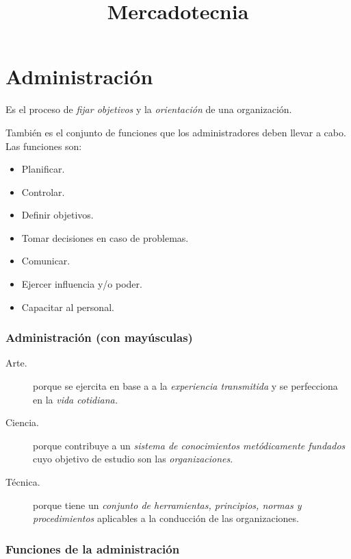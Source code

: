 \documentclass[9pt, spanish, a5paper]{article}
\begin{document}
\date{}

\title{\textbf{{\huge Mercadotecnia}}}
	\maketitle


\newpage

 \tableofcontents

\bigskip
\listoffigures



\newpage



\part{Administración}
Es el proceso de \emph{fijar objetivos} y la \emph{orientación} de una organización.

También es el conjunto de funciones que los administradores deben llevar a cabo. Las funciones son:
\begin{itemize}
	\item Planificar.
	\item Controlar.
	\item Definir objetivos.
	\item Tomar decisiones en caso de problemas.
	\item Comunicar.
	\item Ejercer influencia y/o poder.
	\item Capacitar al personal.
\end{itemize}

\section{Administración (con mayúsculas)}
\begin{description}
	\item[Arte.]	porque se ejercita en base a a la \emph{experiencia transmitida} y  se perfecciona en la \emph{vida cotidiana.}
\item[Ciencia.] porque contribuye a un \emph{sistema de conocimientos metódicamente fundados} cuyo objetivo de estudio son las \emph{organizaciones}.
\item[Técnica.] porque tiene un \emph{conjunto de herramientas, principios, normas y procedimientos} aplicables a la conducción de las organizaciones.
\end{description}

\section{Funciones de la administración}
\end{document}
